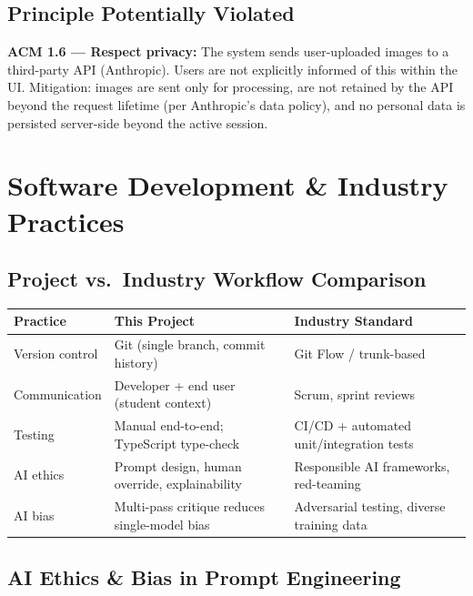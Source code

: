 \documentclass[12pt,a4paper]{article}
\begin{document}
\subsection{Principle Potentially Violated}

\textbf{ACM 1.6 — Respect privacy:} The system sends user-uploaded images to a third-party API
(Anthropic). Users are not explicitly informed of this within the UI. Mitigation: images are
sent only for processing, are not retained by the API beyond the request lifetime (per
Anthropic's data policy), and no personal data is persisted server-side beyond the active
session.


\section{Software Development \& Industry Practices}

\subsection{Project vs.\ Industry Workflow Comparison}

\begin{center}
\begin{tabular}{lp{5cm}p{5cm}}
  \toprule
  \textbf{Practice} & \textbf{This Project} & \textbf{Industry Standard} \\
  \midrule
  Version control   & Git (single branch, commit history) & Git Flow / trunk-based \\
  Communication     & Developer + end user (student context) & Scrum, sprint reviews \\
  Testing           & Manual end-to-end; TypeScript type-check & CI/CD + automated unit/integration tests \\
  AI ethics         & Prompt design, human override, explainability & Responsible AI frameworks, red-teaming \\
  AI bias           & Multi-pass critique reduces single-model bias & Adversarial testing, diverse training data \\
  \bottomrule
\end{tabular}
\end{center}

\subsection{AI Ethics \& Bias in Prompt Engineering}
\end{document}
